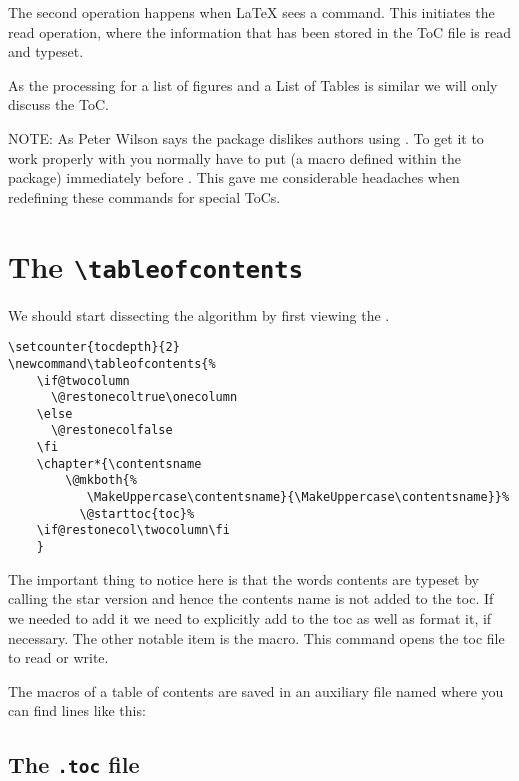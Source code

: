 The second operation happens when LaTeX sees a  command. This initiates the read operation, where the information that has been stored in the ToC file is read and typeset.

As the processing for a list of figures and a List of Tables is similar we will only discuss the ToC.


 NOTE: As Peter Wilson says the  package dislikes authors using
. To get it to work properly with   you normally have to put  (a macro defined within  the  package) immediately  before . This gave me considerable headaches when redefining these commands for special ToCs.


\section{The \texttt{\textbackslash tableofcontents}}

We should start dissecting the algorithm by first viewing the .

\begin{tcolorbox}{}
\begin{lstlisting}
\setcounter{tocdepth}{2}
\newcommand\tableofcontents{%
    \if@twocolumn
      \@restonecoltrue\onecolumn
    \else
      \@restonecolfalse
    \fi
    \chapter*{\contentsname
        \@mkboth{%
           \MakeUppercase\contentsname}{\MakeUppercase\contentsname}}%
          \@starttoc{toc}%
    \if@restonecol\twocolumn\fi
    }
\end{lstlisting}
\end{tcolorbox}

The important thing to notice here is that the words contents are typeset by calling the star version and hence the contents name is not added to the toc. If we needed to add it we need to explicitly add to the toc as well as format it, if necessary. The other notable item is the  macro. This command opens the toc file to read or write.

The macros of a table of contents are saved in an auxiliary file named  where you can find lines like this:

\subsection{The \texttt{.toc} file}
